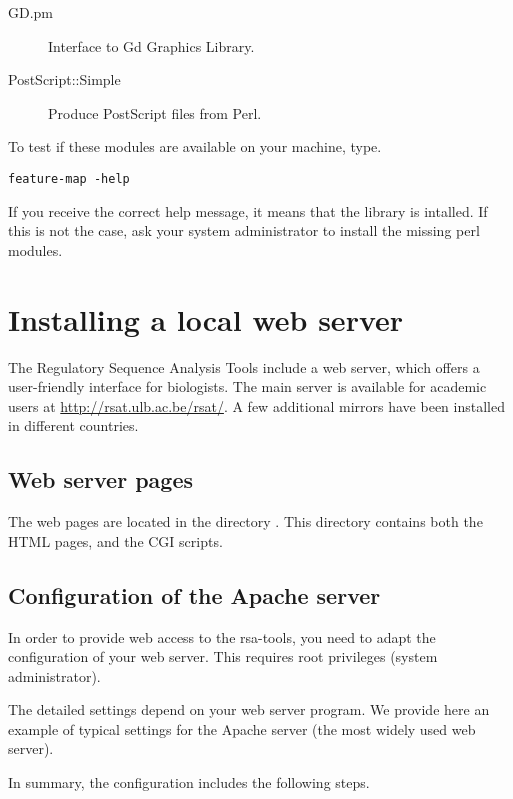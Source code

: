 \documentclass{article}
\begin{document}
\begin{description}
\item[GD.pm] Interface to Gd Graphics Library.
\item[PostScript::Simple]  Produce PostScript files from Perl.
\end{description}


To test if these modules are available on your machine, type.

\begin{verbatim}
feature-map -help
\end{verbatim}

If you receive the correct help message, it means that the library is
intalled. If this is not the case, ask your system administrator to
install the missing perl modules.



\section{Installing a local web server}

The Regulatory Sequence Analysis Tools include a web server, which
offers a user-friendly interface for biologists. The main server is
available for academic users at \url{http://rsat.ulb.ac.be/rsat/}. A
few additional mirrors have been installed in different countries.

\subsection{Web server pages}

The web pages are located in the directory
. This directory contains both the HTML
pages, and the CGI scripts.

\subsection{Configuration of the Apache server}

In order to provide web access to the rsa-tools, you need to adapt the
configuration of your web server. This requires root privileges
(system administrator). 


The detailed settings depend on your web server program. We provide
here an example of typical settings for the Apache server (the most
widely used web server).

In summary, the configuration includes the following steps.
\end{document}
